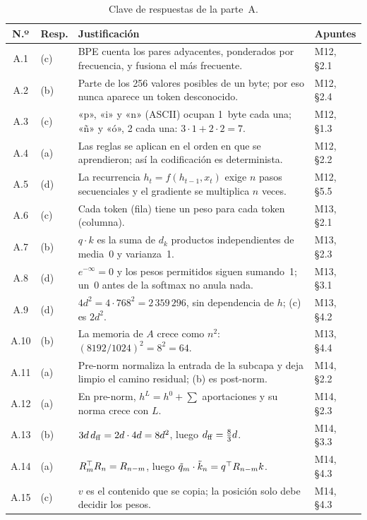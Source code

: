 \begin{table}[H]
\centering\footnotesize
\renewcommand{\arraystretch}{1.05}
\caption{Clave de respuestas de la parte~A.}\label{tab:clave}
\begin{tabularx}{\textwidth}{@{}clX>{\raggedright\arraybackslash}p{1.95cm}@{}}
\toprule
N.º & Resp. & Justificación & Apuntes \\
\midrule
A.1 & (c) & BPE cuenta los pares adyacentes, ponderados por frecuencia, y fusiona el más frecuente. & M12, §2.1 \\
A.2 & (b) & Parte de los 256 valores posibles de un byte; por eso nunca aparece un token desconocido. & M12, §2.4 \\
A.3 & (c) & «p», «i» y «n» (ASCII) ocupan 1~byte cada una; «ñ» y «ó», 2 cada una: $3\cdot 1+2\cdot 2=7$. & M12, §1.3 \\
A.4 & (a) & Las reglas se aplican en el orden en que se aprendieron; así la codificación es determinista. & M12, §2.2 \\
A.5 & (d) & La recurrencia $h_t=f(h_{t-1},x_t)$ exige $n$ pasos secuenciales y el gradiente se multiplica $n$ veces. & M12, §5.5 \\
A.6 & (c) & Cada token (fila) tiene un peso para cada token (columna). & M13, §2.1 \\
A.7 & (b) & $q\cdot k$ es la suma de $d_k$ productos independientes de media~0 y varianza~1. & M13, §2.3 \\
A.8 & (d) & $e^{-\infty}=0$ y los pesos permitidos siguen sumando~1; un~0 antes de la softmax no anula nada. & M13, §3.1 \\
A.9 & (d) & $4d^{2}=4\cdot 768^{2}=2\,359\,296$, sin dependencia de $h$; (c) es $2d^{2}$. & M13, §4.2 \\
A.10 & (b) & La memoria de $A$ crece como $n^{2}$: $(8192/1024)^{2}=8^{2}=64$. & M13, §4.4 \\
A.11 & (a) & Pre-norm normaliza la entrada de la subcapa y deja limpio el camino residual; (b) es post-norm. & M14, §2.2 \\
A.12 & (a) & En pre-norm, $h^{L}=h^{0}+\sum$ aportaciones y su norma crece con $L$. & M14, §2.3 \\
A.13 & (b) & $3d\,d_{\mathrm{ff}}=2d\cdot 4d=8d^{2}$, luego $d_{\mathrm{ff}}=\tfrac{8}{3}d$. & M14, §3.3 \\
A.14 & (a) & $R_m^{\top} R_n=R_{n-m}$, luego $\tilde q_m\cdot\tilde k_n=q^{\top} R_{n-m}k$. & M14, §4.3 \\
A.15 & (c) & $v$ es el contenido que se copia; la posición solo debe decidir los pesos. & M14, §4.3 \\

\end{tabularx}
\end{table}
